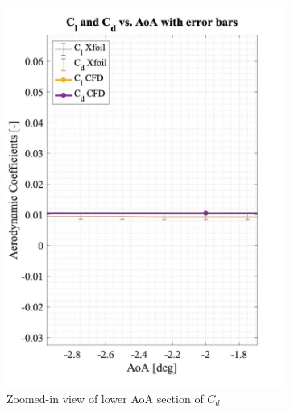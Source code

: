 \begin{figure}[H]
  \begin{subfigure}[b]{0.5\textwidth}
    \includegraphics[width=\textwidth]{error_bar2.jpg}
    \caption{Zoomed-in view of lower AoA section of $C_d$}
    \label{fig:error_bar2}
  \end{subfigure}
  \begin{subfigure}[b]{0.5\textwidth}

\end{subfigure}
\end{figure}
